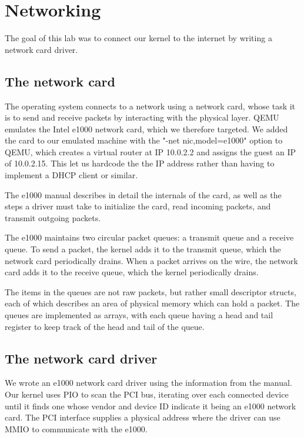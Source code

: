 \documentclass{report}
\begin{document}
\chapter{Networking}
The goal of this lab was to connect our kernel to the internet by writing a
network card driver.

\section{The network card}
The operating system connects to a network using a network card, whose task it
is to send and receive packets by interacting with the physical layer. QEMU
emulates the Intel e1000 network card, which we therefore targeted. We added
the card to our emulated machine with the "-net nic,model=e1000" option to
QEMU, which creates a virtual router at IP 10.0.2.2 and assigns the guest an
IP of 10.0.2.15. This let us hardcode the the IP address rather than having to
implement a DHCP client or similar.

The e1000 manual \cite{e1000manual} describes in detail the internals of the
card, as well as the steps a driver must take to initialize the card, read
incoming packets, and transmit outgoing packets. 

The e1000 maintains two circular packet queues: a transmit queue and a receive
queue. To send a packet, the kernel adds it to the transmit queue, which the
network card periodically drains. When a packet arrives on the wire, the
network card adds it to the receive queue, which the kernel periodically
drains.

The items in the queues are not raw packets, but rather small descriptor
structs, each of which describes an area of physical memory which can hold a
packet. The queues are implemented as arrays, with each queue having a head
and tail register to keep track of the head and tail of the queue.



\section{The network card driver}
We wrote an e1000 network card driver using the information from the manual.
Our kernel uses PIO to scan the PCI bus, iterating over each connected
device until it finds one whose vendor and device ID indicate it being an
e1000 network card. The PCI interface supplies a physical address where the
driver can use MMIO to communicate with the e1000.
\end{document}
